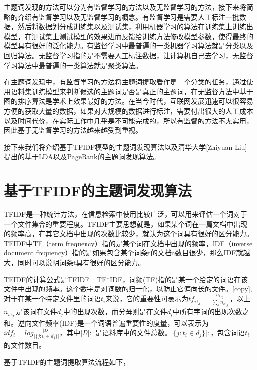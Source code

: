 \documentclass[master]{njuthesis}
\begin{document}
    主题词发现的方法可以分为有监督学习的方法以及无监督学习的方法，接下来将简略的介绍有监督学习以及无监督学习的概念。有监督学习是需要人工标注一批数据，然后将数据划分成训练集以及测试集，利用机器学习的算法在训练集上训练出模型，在测试集上测试模型的效果进而反馈给训练方法修改模型参数，使得最终的模型具有很好的泛化能力。有监督学习中最普遍的一类机器学习算法就是分类以及回归算法。无监督学习指的是不需要人工标注数据，让计算机自己去学习，无监督学习算法中最普遍的一类算法就是聚类算法。

    在主题词发现中，有监督学习的方法将主题词提取看作是一个分类的任务，通过使用语料集训练模型来判断候选的主题词是否是真正的主题词，在无监督方法中基于图的排序算法是学术上效果最好的方法。在当今时代，互联网发展迅速可以很容易方便的获取大量的数据，如果对大规模的数据进行标注，需要付出很大的人工成本以及时间代价，在实际工作中几乎是不可能完成的，所以有监督的方法不太实用，因此基于无监督学习的方法越来越受到重视。

    接下来我们将介绍基于TFIDF模型的主题词发现算法以及清华大学[Zhiyuan Liu]\cite{keyphrase}提出的基于LDA以及PageRank的主题词发现算法。

\section{基于TFIDF的主题词发现算法}

    TFIDF是一种统计方法，在信息检索中使用比较广泛，可以用来评估一个词对于一个文件集合的重要程度。TFIDF主要思想就是，如果某个词在一篇文档中出现的频率高，在其它文档中出现的次数比较少，就认为这个词具有很好的区分能力。TFIDF中TF（term frequency）指的是某个词在文档中出现的频率，IDF（inverse document frequency）指的是如果包含某个词条t的文档n数目很少，那么IDF就越大，同时可以说明词条t具有很好的区分能力。

    TFIDF的计算公式是TFIDF= TF*IDF，词频(TF)指的是某一个给定的词语在该文件中出现的频率。这个数字是对词数的归一化，以防止它偏向长的文件。[copy],对于在某一个特定文件里的词语$t_i$来说，它的重要性可表示为$tf_i,_j = \frac{n_i,_j}{\sum_{k} n_k,_j}$，以上$n_i,_j$是该词在文件$d_j$中的出现次数，而分母则是在文件$d_j$中所有字词的出现次数之和。逆向文件频率(IDF)是一个词语普遍重要性的度量，可以表示为$idf_i = log\frac{\vert D \vert}{\vert \{j:t_i \in d_j \}\vert}$，其中$\vert D \vert:$ 是语料库中的文件总数。$\vert\{ j:t_i \in d_j\}\vert:$，包含词语$t_i$的文件数目。

    基于TFIDF的主题词提取算法流程如下，\\

\\
\end{document}
